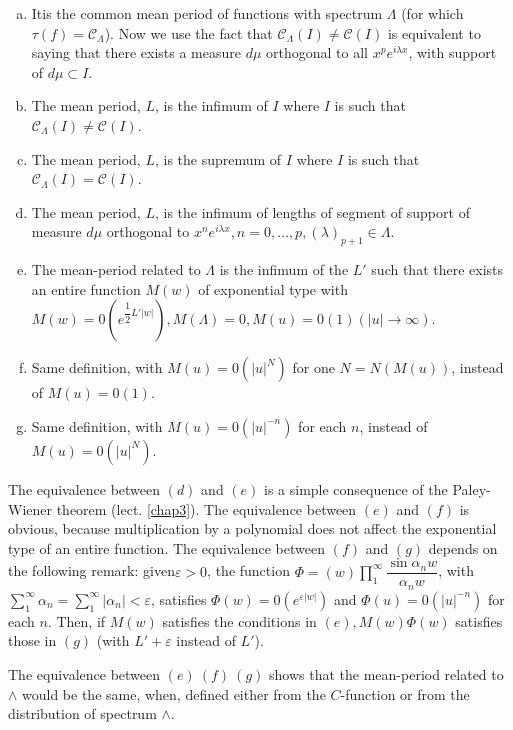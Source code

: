 \begin{enumerate}[(a)]
\item It\pageoriginale is the common mean period of functions with spectrum
 $\Lambda$ (for which $\tau(f) = \mathscr{C}_{\Lambda}$). Now we use
 the fact that $\mathscr{C}_\Lambda(I) \neq \mathscr{C}(I)$ is
 equivalent to saying that there exists a measure $d \mu$ orthogonal
 to all $x^p e^{i \lambda x}$, with support of $d \mu \subset I$. 
\item The mean period, $L$, is the infimum of $I$ where $I$ is such
 that $\mathscr{C}_{\Lambda} (I) \neq \mathscr{C} (I)$. 
\item The mean period, $L$, is the supremum of $I$ where $I$ is such
 that $\mathscr{C}_{\Lambda}(I)=\mathscr{C}(I)$. 
\item The mean period, $L$, is the infimum of lengths of segment of
 support of measure $d \mu$ orthogonal to $x^n e^{i \lambda x}, n=0,
 \ldots, p, (\lambda)_{p+1}\in \Lambda$. 
\item The mean-period related to $\Lambda$ is the infimum of the $L'$
 such that there exists an entire function $M(w)$ of exponential type
 with $M(w) = 0 (e^{\dfrac{1}{2}L'|w|}), M(\Lambda) = 0, M(u) =
 0(1)(|u| \to \infty)$. 
\item Same definition, with $M(u) = 0(|u|^N)$ for one $N = N(M(u))$,
 instead of $M(u) = 0(1)$. 
\item Same definition, with $M(u) = 0(|u|^{-n})$ for each $n$, instead
 of $M(u) = 0(|u|^N)$. 
\end{enumerate}

The equivalence between $(d)$ and $(e)$ is a simple consequence of the
Paley-Wiener theorem (lect. \ref{chap3}). The equivalence between $(e)$ and
$(f)$ is obvious, because multiplication by a polynomial does not
affect the exponential type of an entire function. The equivalence
between $(f)$ and $(g)$ depends on the following remark: given\pageoriginale $\varepsilon >
0$, the function $\Phi= (w)\prod\limits_1^{\infty}\dfrac{\sin \alpha_n
 w}{\alpha_n w}$, with $\sum\limits_1^\infty \alpha_n =
\sum\limits_1^\infty |\alpha_n| < \varepsilon$, satisfies $\Phi (w) =
0(e^{\varepsilon |w|})$ and $\Phi (u) = 0(|u|^{-n})$ for each
$n$. Then, if $M(w)$ satisfies the conditions in $(e), M(w) \Phi (w)$
satisfies those in $(g)$ (with $L'+\varepsilon$ instead of $L'$). 

The equivalence between $(e)~(f)~(g)$ shows that the mean-period
related to $\wedge$ would be the same, when, defined either from the
$C$-function or from the distribution of spectrum $\wedge$. 

